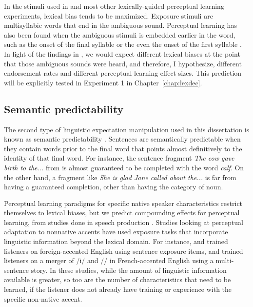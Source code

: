
In the stimuli used in \citet{Norris2003} and most other lexically-guided perceptual learning experiments, lexical bias tends to be maximized.  Exposure stimuli are multisyllabic words that end in the ambiguous sound.  Perceptual learning has also been found when the ambiguous stimuli is embedded earlier in the word, such as the onset of the final syllable \citep{Kraljic2005, Kraljic2008, Kraljic2008a} or the even the onset of the first syllable \citep{Clare2014}.  In light of the findings in \citet{Pitt2012}, we would expect different lexical biases at the point that those ambiguous sounds were heard, and therefore, I hypothesize, different endorsement rates and different perceptual learning effect sizes.  This prediction will be explicitly tested in Experiment 1 in Chapter~\ref{chap:lexdec}.

\subsection{Semantic predictability}
\label{sec:semanticpredictability}

The second type of linguistic expectation manipulation used in this dissertation is known as semantic predictability \citep{Kalikow1977}.
Sentences are semantically predictable when they contain words prior to the final word that points almost definitively to the identity of that final word.  
For instance, the sentence fragment \emph{The cow gave birth to the...} from \citet{Kalikow1977} is almost guaranteed to be completed with the word \emph{calf}.  
On the other hand, a fragment like \emph{She is glad Jane called about the...} is far from having a guaranteed completion, other than having the category of noun.

Perceptual learning paradigms for specific native speaker characteristics restrict themselves to lexical biases, but we predict compounding effects for perceptual learning, from studies done in speech production \citep{Clopper2008, Scarborough2010}.  
Studies looking at perceptual adaptation to nonnative accents have used exposure tasks that incorporate linguistic information beyond the lexical domain.  
For instance, \citet{Clarke2004} and \citet{Bradlow2008} trained listeners on foreign-accented English using sentence exposure items, and \citet{Trude2013} trained listeners on a merger of /i/ and /\textsci/ in French-accented English using a multi-sentence story.
In these studies, while the amount of linguistic information available is greater, so too are the number of characteristics that need to be learned, if the listener does not already have training or experience with the specific non-native accent.

